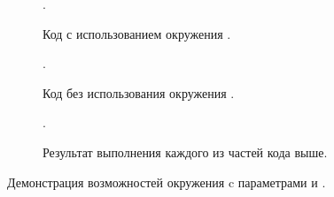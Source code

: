 \begin{figure}[htp!]
    \centering
    \begin{subfigure}{\textwidth}
        \begin{Latexcode}
            \begin{rslingu}
                  
                 .
            \end{rslingu}
        \end{Latexcode}
        \caption{Код с использованием окружения .}
    \end{subfigure}\vspace*{.75cm}
    \begin{subfigure}{\textwidth}
        \begin{Latexcode}
             
             
            .
        \end{Latexcode}
        \caption{Код без использования окружения .}
    \end{subfigure}\vspace*{.75cm}
    \begin{subfigure}{.9\textwidth}
        \centering
        \begin{rslingu}
              
             .
        \end{rslingu}
        \caption{Результат выполнения каждого из частей кода выше.}
    \end{subfigure}
    \caption{Демонстрация возможностей окружения  c параметрами  и .}
    \label{fig:rslingu-demo-full}
\end{figure}



\clearpage

